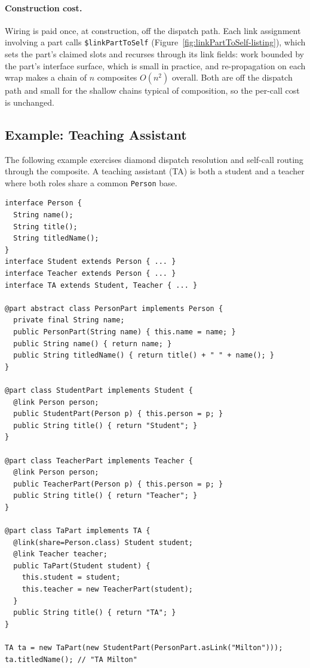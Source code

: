 \documentclass[acmsmall,screen,review,anonymous]{acmart}
\theoremstyle{acmplain}
\newcommand{\code}[1]{\texttt{#1}}
\begin{document}
\paragraph{Construction cost.}
Wiring is paid once, at construction, off the dispatch path. Each link assignment
involving a part calls \code{\$linkPartToSelf}
(Figure~\ref{fig:linkPartToSelf-listing}), which sets the part's claimed slots and
recurses through its link fields: work bounded by the part's interface surface,
which is small in practice, and re-propagation on each wrap makes a chain of $n$
composites $O(n^2)$ overall. Both are off the dispatch path and small for the
shallow chains typical of composition, so the per-call cost is unchanged.

\subsection{Example: Teaching Assistant}

The following example exercises diamond dispatch resolution and self-call routing through the composite. A teaching assistant (TA)
is both a student and a teacher where both roles share a common \code{Person} base.

\begin{lstlisting}
interface Person {
  String name();
  String title();
  String titledName();
}
interface Student extends Person { ... }
interface Teacher extends Person { ... }
interface TA extends Student, Teacher { ... }

@part abstract class PersonPart implements Person {
  private final String name;
  public PersonPart(String name) { this.name = name; }
  public String name() { return name; }
  public String titledName() { return title() + " " + name(); }
}

@part class StudentPart implements Student {
  @link Person person;
  public StudentPart(Person p) { this.person = p; }
  public String title() { return "Student"; }
}

@part class TeacherPart implements Teacher {
  @link Person person;
  public TeacherPart(Person p) { this.person = p; }
  public String title() { return "Teacher"; }
}

@part class TaPart implements TA {
  @link(share=Person.class) Student student;
  @link Teacher teacher;
  public TaPart(Student student) {
    this.student = student;
    this.teacher = new TeacherPart(student);
  }
  public String title() { return "TA"; }
}

TA ta = new TaPart(new StudentPart(PersonPart.asLink("Milton")));
ta.titledName(); // "TA Milton"
\end{lstlisting}
\end{document}
